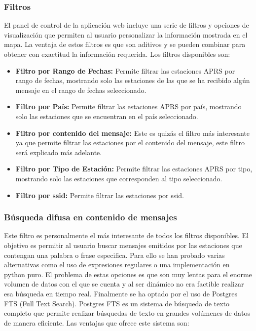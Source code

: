 \subsubsection{Filtros}
El panel de control de la aplicación web incluye una serie de filtros y opciones de visualización que permiten al usuario personalizar la información mostrada en el mapa. La ventaja de estos filtros es que son aditivos y se pueden combinar para obtener con exactitud la información requerida. Los filtros disponibles son:
\begin{itemize}
	\item \textbf{Filtro por Rango de Fechas:} Permite filtrar las estaciones APRS por rango de fechas, mostrando solo las estaciones de las que se ha recibido algún mensaje en el rango de fechas seleccionado.
	\item \textbf{Filtro por País:} Permite filtrar las estaciones APRS por país, mostrando solo las estaciones que se encuentran en el país seleccionado.
	\item \textbf{Filtro por contenido del mensaje:} Este es quizás el filtro más interesante ya que permite filtrar las estaciones por el contenido del mensaje, este filtro será explicado más adelante. 
	\item \textbf{Filtro por Tipo de Estación:} Permite filtrar las estaciones APRS por tipo, mostrando solo las estaciones que corresponden al tipo seleccionado.
	\item \textbf{Filtro por ssid:} Permite filtrar las estaciones por ssid.
\end{itemize}

\subsubsection{Búsqueda difusa en contenido de mensajes}
Este filtro es personalmente el más interesante de todos los filtros disponibles. El objetivo es permitir al usuario buscar mensajes emitidos por las estaciones que contengan una palabra o frase especifica. Para ello se han probado varias alternativas como el uso de expresiones regulares o una implementación en python puro. El problema de estas opciones es que son muy lentas para el enorme volumen de datos con el que se cuenta y al ser dinámico no era factible realizar esa búsqueda en tiempo real. 
Finalmente se ha optado por el uso de Postgres FTS (Full Text Search). Postgres FTS es un sistema de búsqueda de texto completo que permite realizar búsquedas de texto en grandes volúmenes de datos de manera eficiente. Las ventajas que ofrece este sistema son:

